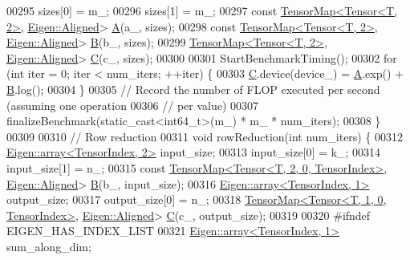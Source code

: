 \begin{DoxyCode}
00295     sizes[0] = m\_;
00296     sizes[1] = m\_;
00297     \textcolor{keyword}{const} \hyperlink{class_eigen_1_1_tensor_map}{TensorMap<Tensor<T, 2>}, \hyperlink{group__enums_gga45fe06e29902b7a2773de05ba27b47a1ad37d4c71425bb286e9b4103830538fbf}{Eigen::Aligned}> 
      \hyperlink{group___core___module_class_eigen_1_1_matrix}{A}(a\_, sizes);
00298     \textcolor{keyword}{const} \hyperlink{class_eigen_1_1_tensor_map}{TensorMap<Tensor<T, 2>}, \hyperlink{group__enums_gga45fe06e29902b7a2773de05ba27b47a1ad37d4c71425bb286e9b4103830538fbf}{Eigen::Aligned}> 
      \hyperlink{group___core___module_class_eigen_1_1_matrix}{B}(b\_, sizes);
00299     \hyperlink{class_eigen_1_1_tensor_map}{TensorMap<Tensor<T, 2>}, \hyperlink{group__enums_gga45fe06e29902b7a2773de05ba27b47a1ad37d4c71425bb286e9b4103830538fbf}{Eigen::Aligned}> 
      \hyperlink{group___core___module}{C}(c\_, sizes);
00300 
00301     StartBenchmarkTiming();
00302     \textcolor{keywordflow}{for} (\textcolor{keywordtype}{int} iter = 0; iter < num\_iters; ++iter) \{
00303       \hyperlink{group___core___module}{C}.device(device\_) = \hyperlink{group___core___module_class_eigen_1_1_matrix}{A}.exp() + \hyperlink{group___core___module_class_eigen_1_1_matrix}{B}.log();
00304     \}
00305     \textcolor{comment}{// Record the number of FLOP executed per second (assuming one operation}
00306     \textcolor{comment}{// per value)}
00307     finalizeBenchmark(static\_cast<int64\_t>(m\_) * m\_ * num\_iters);
00308   \}
00309 
00310  \textcolor{comment}{// Row reduction}
00311   \textcolor{keywordtype}{void} rowReduction(\textcolor{keywordtype}{int} num\_iters) \{
00312     \hyperlink{class_eigen_1_1array}{Eigen::array<TensorIndex, 2>} input\_size;
00313     input\_size[0] = k\_;
00314     input\_size[1] = n\_;
00315     \textcolor{keyword}{const} \hyperlink{class_eigen_1_1_tensor_map}{TensorMap<Tensor<T, 2, 0, TensorIndex>}, 
      \hyperlink{group__enums_gga45fe06e29902b7a2773de05ba27b47a1ad37d4c71425bb286e9b4103830538fbf}{Eigen::Aligned}> \hyperlink{group___core___module_class_eigen_1_1_matrix}{B}(b\_, input\_size);
00316     \hyperlink{class_eigen_1_1array}{Eigen::array<TensorIndex, 1>} output\_size;
00317     output\_size[0] = n\_;
00318     \hyperlink{class_eigen_1_1_tensor_map}{TensorMap<Tensor<T, 1, 0, TensorIndex>}, 
      \hyperlink{group__enums_gga45fe06e29902b7a2773de05ba27b47a1ad37d4c71425bb286e9b4103830538fbf}{Eigen::Aligned}> \hyperlink{group___core___module}{C}(c\_, output\_size);
00319 
00320 \textcolor{preprocessor}{#ifndef EIGEN\_HAS\_INDEX\_LIST}
00321     \hyperlink{class_eigen_1_1array}{Eigen::array<TensorIndex, 1>} sum\_along\_dim;

\end{DoxyCode}
